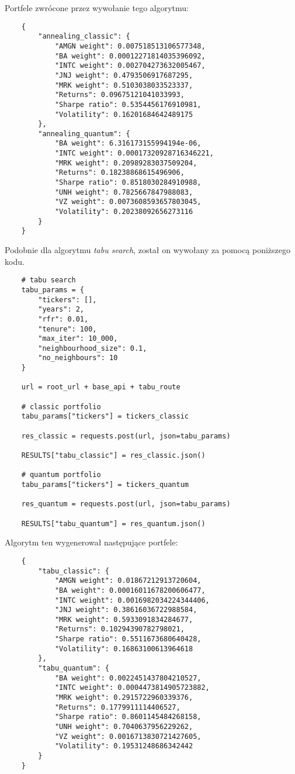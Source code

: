 \documentclass[12pt,a4paper,twoside,openany]{book}
\begin{document}
Portfele zwrócone przez wywołanie tego algorytmu:

\begin{verbatim}
    {
        "annealing_classic": {
            "AMGN weight": 0.007518513106577348,
            "BA weight": 0.00012271814035396092,
            "INTC weight": 0.002704273632005467,
            "JNJ weight": 0.4793506917687295,
            "MRK weight": 0.5103038033523337,
            "Returns": 0.09675121041033993,
            "Sharpe ratio": 0.5354456176910981,
            "Volatility": 0.16201684642489175
        },
        "annealing_quantum": {
            "BA weight": 6.316173155994194e-06,
            "INTC weight": 0.00017320928716346221,
            "MRK weight": 0.20989283037509204,
            "Returns": 0.18238868615496906,
            "Sharpe ratio": 0.8518030284910988,
            "UNH weight": 0.7825667847988083,
            "VZ weight": 0.0073608593657803045,
            "Volatility": 0.20238092656273116
        }
    }
\end{verbatim}

Podobnie dla algorytmu \textit{tabu search}, został on wywołany za pomocą poniższego kodu.

\begin{verbatim}
    # tabu search
    tabu_params = {
        "tickers": [],
        "years": 2,
        "rfr": 0.01,
        "tenure": 100,
        "max_iter": 10_000,
        "neighbourhood_size": 0.1,
        "no_neighbours": 10
    }
    
    url = root_url + base_api + tabu_route

    # classic portfolio
    tabu_params["tickers"] = tickers_classic
    
    res_classic = requests.post(url, json=tabu_params)
    
    RESULTS["tabu_classic"] = res_classic.json()
    
    # quantum portfolio
    tabu_params["tickers"] = tickers_quantum
    
    res_quantum = requests.post(url, json=tabu_params)
    
    RESULTS["tabu_quantum"] = res_quantum.json()
\end{verbatim}

Algorytm ten wygenerował następujące portfele:

\begin{verbatim}
    {
        "tabu_classic": {
            "AMGN weight": 0.01867212913720604,
            "BA weight": 0.00016011678200606477,
            "INTC weight": 0.0016982034224344406,
            "JNJ weight": 0.38616036722988584,
            "MRK weight": 0.5933091834284677,
            "Returns": 0.10294390782798021,
            "Sharpe ratio": 0.5511673680640428,
            "Volatility": 0.16863100613964618
        },
        "tabu_quantum": {
            "BA weight": 0.0022451437804210527,
            "INTC weight": 0.0004473814905723882,
            "MRK weight": 0.2915722960339376,
            "Returns": 0.1779911114406527,
            "Sharpe ratio": 0.8601145484268158,
            "UNH weight": 0.7040637956229262,
            "VZ weight": 0.0016713830721427605,
            "Volatility": 0.19531248686342442
        }
    }
\end{verbatim}
\end{document}
